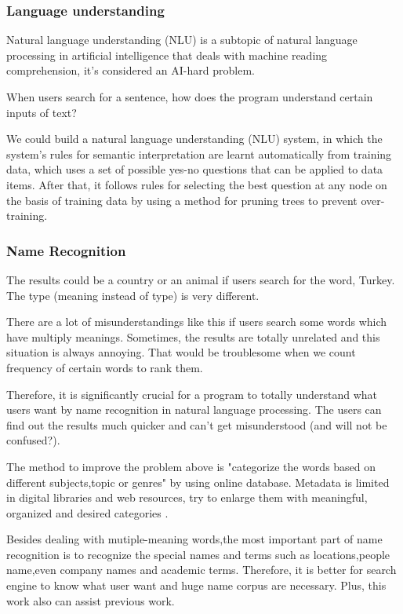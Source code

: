 \subsubsection*{Language understanding}
Natural language understanding (NLU) is a subtopic of natural language processing in artificial intelligence that deals with machine reading comprehension, it's considered an AI-hard problem.

When users search for a sentence, how does the program understand certain inputs of text? 

We could build a natural language understanding (NLU) system, in which the system's rules for semantic interpretation are 
learnt automatically from training data, which uses a set of possible yes-no questions that can be applied to data items.
After that, it follows rules for selecting the best question at any node on the basis of training data by using a method for pruning trees to prevent over-training.

\subsubsection*{Name Recognition}

The results could be a country or an animal if users search for the word, Turkey. The type (meaning instead of type) is very different.

There are a lot of misunderstandings like this if users search some words which have multiply meanings.
Sometimes, the results are totally unrelated and this situation is always annoying. 
That would be troublesome when we count frequency of certain words to rank them.
 
Therefore, it is significantly crucial for a program to totally understand what users want by name recognition in natural language processing. 
The users can find out the results much quicker and can't get misunderstood (and will not be confused?).

The method to improve the problem above is "categorize the words based on different subjects,topic or genres" by using online database.
Metadata is limited in digital libraries and web resources, try to enlarge them with meaningful, organized and desired
categories \cite{Kules2006}.

Besides dealing with mutiple-meaning words,the most important part of name recognition is to recognize the special names and terms such as locations,people name,even company names and academic terms.
Therefore, it is better for search engine to know what user want and huge name corpus are necessary. Plus, this work also can assist previous work.



